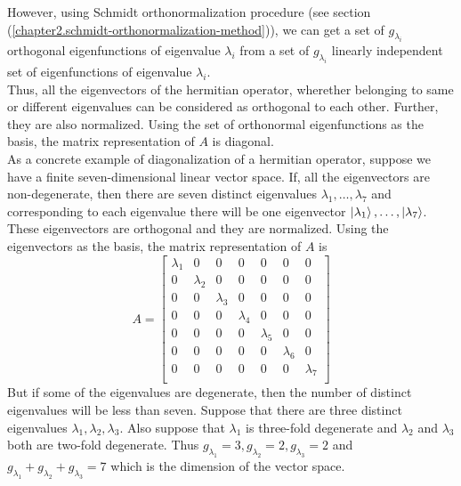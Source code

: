 	However, using Schmidt orthonormalization procedure (see section (\ref{chapter2.schmidt-orthonormalization-method})), we can get a set of $g_{\lambda_i}$ orthogonal 
	eigenfunctions %
	  of eigenvalue $\lambda_i$ from a set of $g_{\lambda_i}$ linearly independent set of
	  eigenfunctions
	   of eigenvalue $\lambda_i$.\\
	   
	   Thus, all the eigenvectors of the hermitian operator, wherether belonging to same or different eigenvalues can be considered as orthogonal to each other. Further, they are also normalized. Using the set of orthonormal eigenfunctions as the basis, the matrix representation of $A$ is diagonal. \\
	   
	   As a concrete example of diagonalization of a hermitian operator, suppose we have a finite seven-dimensional linear vector space. If, all the eigenvectors are non-degenerate, then there are seven distinct eigenvalues $\lambda_1, \ldots, \lambda_7$ and corresponding to each eigenvalue there will be one eigenvector $\ket{\lambda_1}, \ldots, \ket{\lambda_7}$. These eigenvectors are orthogonal and they are normalized. Using the eigenvectors as the basis, the matrix representation of $A$ is 
	   \begin{equation}
		   A = \left[
		   \begin{matrix}
	\lambda_1 & 0 & 0 & 0 & 0 & 0 & 0 \\
	0 & \lambda_2 & 0 & 0 & 0 & 0 & 0 \\
	0 & 0 & \lambda_3 & 0 & 0 & 0 & 0 \\
	0 & 0 & 0 & \lambda_4 & 0 & 0 & 0 \\
	0 & 0 & 0 & 0 & \lambda_5 & 0 & 0 \\
	0 & 0 & 0 & 0 & 0 & \lambda_6 & 0 \\
	0 & 0 & 0 & 0 & 0 & 0 & \lambda_7 \\
		   \end{matrix}
		   \right]
	   \end{equation}
	But if some of the eigenvalues are degenerate, then the number of distinct eigenvalues will be less than seven. Suppose that there are three distinct eigenvalues $\lambda_1, \lambda_2, \lambda_3$. Also suppose that $\lambda_1$ is three-fold degenerate and $\lambda_2$ and $\lambda_3$ both are two-fold degenerate. Thus $g_{\lambda_1}=3, g_{\lambda_2}=2, g_{\lambda_3}=2$ and $g_{\lambda_1} + g_{\lambda_2} + g_{\lambda_3}=7$ which is the dimension of the vector space.\\
	
